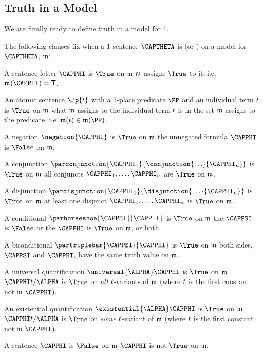 
\subsection{Truth in a Model}\label{GQL1 Truth in an Interpretation}
We are finally ready to define truth in a model for \GQL{}1.

\begin{majorILnc}{}
The following clauses fix when a \GQL{}1 sentence $\CAPTHETA$ is \nidf{$\True$} (or \nidf{$\False$}) on a model for $\CAPTHETA$, $\mathfrak{m}$:
\begin{cenumerate}
\item A sentence letter $\CAPPHI$ is $\True$ on $\mathfrak{m}$ \Iff $\mathfrak{m^{\mathrm{}}_{\mathrm{}}}$ assigns $\True$ to it, i.e. \Iff $\As{}{}(\CAPPHI)=\TrueB$.
\item An atomic sentence $\Pp{\variable{t}}$ with a 1-place predicate $\PP$ and an individual term $t$ is $\True$ on $\mathfrak{m}$ \Iff what $\mathfrak{m}$ assigns to the individual term $t$ is in the set $\mathfrak{m}$ assigns to the predicate, i.e. \Iff $\IntA(\variable{t})\in\IntA(\PP)$.
\item A negation $\negation{\CAPPHI}$ is $\True$ on $\mathfrak{m}$ \Iff the unnegated formula $\CAPPHI$ is $\False$ on $\mathfrak{m}$.
\item A conjunction $\parconjunction{\CAPPHI_1}{\conjunction{\ldots}{\CAPPHI_{\integer{n}}}}$ is $\True$ on $\mathfrak{m}$ \Iff all conjuncts $\CAPPHI_1,\ldots,\CAPPHI_{\integer{n}}$ are $\True$ on $\mathfrak{m}$.
\item A disjunction $\pardisjunction{\CAPPHI_1}{\disjunction{\ldots}{\CAPPHI_{\integer{n}}}}$ is $\True$ on $\mathfrak{m}$ \Iff at least one disjunct $\CAPPHI_1,\ldots,\CAPPHI_{\integer{n}}$ is $\True$ on $\mathfrak{m}$.
\item A conditional $\parhorseshoe{\CAPPSI}{\CAPPHI}$ is $\True$ on $\mathfrak{m}$ \Iff the  $\CAPPSI$ is $\False$ or the  $\CAPPHI$ is $\True$ on $\mathfrak{m}$, or both.
\item A biconditional $\partriplebar{\CAPPSI}{\CAPPHI}$ is $\True$ on $\mathfrak{m}$ \Iff both sides, $\CAPPSI$ and $\CAPPHI$, have the same truth value on $\mathfrak{m}$.
\item\label{GQL1TruthUnvQuant} A universal quantification $\universal{\ALPHA}\CAPPHI$ is $\True$ on $\mathfrak{m}$ \Iff $\CAPPHI\variable{t}/\ALPHA$ is $\True$ on \emph{all} $t$-variants of $\mathfrak{m}$ (where $t$ is the first constant not in $\CAPPHI$).
\item An existential quantification $\existential{\ALPHA}\CAPPHI$ is $\True$ on $\mathfrak{m}$ \Iff $\CAPPHI\variable{t}/\ALPHA$ is $\True$ on \emph{some} $t$-variant of $\mathfrak{m}$ (where $t$ is the first constant not in $\CAPPHI$).
\item A sentence $\CAPPHI$ is $\False$ on $\mathfrak{m}$ \Iff $\CAPPHI$ is not $\True$ on $\mathfrak{m}$.
\end{cenumerate}
\end{majorILnc}

